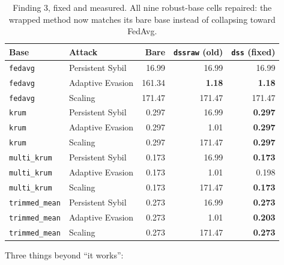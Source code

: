 \documentclass[11pt,a4paper]{article}
\newcommand{\code}[1]{\texttt{\small #1}}
\newcommand{\best}[1]{\textbf{#1}}
\newcommand{\bad}[1]{\textcolor{red!70!black}{#1}}
\begin{document}
\begin{table}[htbp]
\centering
\small
\caption{Finding 3, fixed and measured. All nine robust-base cells
repaired: the wrapped method now matches its bare base instead of
collapsing toward FedAvg.}
\label{tab:finding3}
\begin{tabular}{llrrr}
\toprule
\textbf{Base} & \textbf{Attack} & \textbf{Bare} & \textbf{\code{dssraw} (old)} & \textbf{\code{dss} (fixed)} \\
\midrule
\code{fedavg} & Persistent Sybil & 16.99  & 16.99  & 16.99 \\
\code{fedavg} & Adaptive Evasion & 161.34 & \best{1.18} & \best{1.18} \\
\code{fedavg} & Scaling          & 171.47 & 171.47 & 171.47 \\
\midrule
\code{krum} & Persistent Sybil & 0.297 & \bad{16.99}  & \best{0.297} \\
\code{krum} & Adaptive Evasion & 0.297 & \bad{1.01}   & \best{0.297} \\
\code{krum} & Scaling          & 0.297 & \bad{171.47} & \best{0.297} \\
\midrule
\code{multi\_krum} & Persistent Sybil & 0.173 & \bad{16.99}  & \best{0.173} \\
\code{multi\_krum} & Adaptive Evasion & 0.173 & \bad{1.01}   & 0.198 \\
\code{multi\_krum} & Scaling          & 0.173 & \bad{171.47} & \best{0.173} \\
\midrule
\code{trimmed\_mean} & Persistent Sybil & 0.273 & \bad{16.99}  & \best{0.273} \\
\code{trimmed\_mean} & Adaptive Evasion & 0.273 & \bad{1.01}   & \best{0.203} \\
\code{trimmed\_mean} & Scaling          & 0.273 & \bad{171.47} & \best{0.273} \\
\bottomrule
\end{tabular}
\end{table}

Three things beyond ``it works'':
\end{document}
